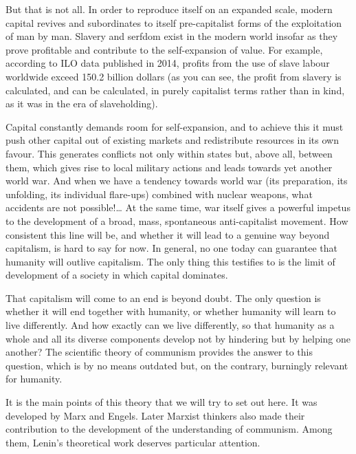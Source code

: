 \documentclass[12pt,a4paper,openany]{book}
\begin{document}
But that is not all. In order to reproduce itself on an expanded scale, modern capital revives and subordinates to itself pre-capitalist forms of the exploitation of man by man. Slavery and serfdom exist in the modern world insofar as they prove profitable and contribute to the self-expansion of value. For example, according to ILO data published in 2014, profits from the use of slave labour worldwide exceed 150.2 billion dollars (as you can see, the profit from slavery is calculated, and can be calculated, in purely capitalist terms rather than in kind, as it was in the era of slaveholding).

Capital constantly demands room for self-expansion, and to achieve this it must push other capital out of existing markets and redistribute resources in its own favour. This generates conflicts not only within states but, above all, between them, which gives rise to local military actions and leads towards yet another world war. And when we have a tendency towards world war (its preparation, its unfolding, its individual flare-ups) combined with nuclear weapons, what accidents are not possible!… At the same time, war itself gives a powerful impetus to the development of a broad, mass, spontaneous anti-capitalist movement. How consistent this line will be, and whether it will lead to a genuine way beyond capitalism, is hard to say for now. In general, no one today can guarantee that humanity will outlive capitalism. The only thing this testifies to is the limit of development of a society in which capital dominates.

That capitalism will come to an end is beyond doubt. The only question is whether it will end together with humanity, or whether humanity will learn to live differently. And how exactly can we live differently, so that humanity as a whole and all its diverse components develop not by hindering but by helping one another? The scientific theory of communism provides the answer to this question, which is by no means outdated but, on the contrary, burningly relevant for humanity.

It is the main points of this theory that we will try to set out here. It was developed by Marx and Engels. Later Marxist thinkers also made their contribution to the development of the understanding of communism. Among them, Lenin's theoretical work deserves particular attention.
\end{document}
